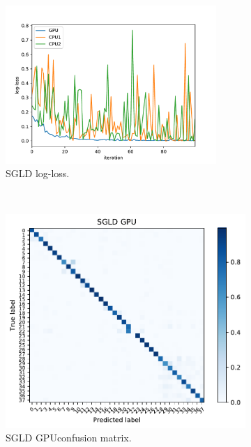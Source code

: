 \documentclass[conference]{IEEEtran}
\begin{document}
\begin{figure}
	\centering
	\begin{subfigure}[b]{0.5\textwidth}
		\includegraphics[width=\textwidth,height=6cm]{results/sgld_losloss}
		\caption{SGLD log-loss.}
		\label{fig:sgld_cpu_gpu}
	\end{subfigure}
	~ %
	\begin{subfigure}[b]{0.5\textwidth}
		\includegraphics[width=\textwidth]{results/plants_confusion_matrix_sgld_gpu}
		\caption{SGLD GPUconfusion matrix.}
		\label{fig:sgld_gpu_performance}
	\end{subfigure}
	~ %
	\begin{subfigure}[b]{0.5\textwidth}

\end{subfigure}
\end{figure}
\end{document}
